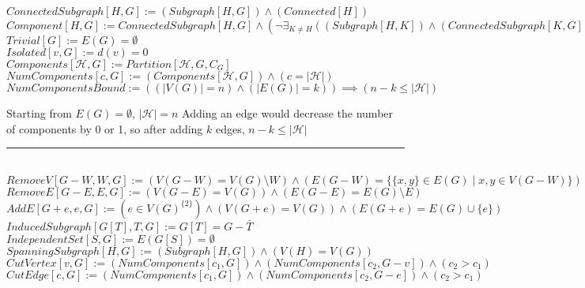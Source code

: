\documentclass{book}
\newcommand{\abr}{:=}
\newcommand{\pr}[1]{\left(#1\right)}
\newcommand{\st}{\mathbin{|}}
\newcommand{\utup}[1]{\{#1\}}
\begin{document}
$ConnectedSubgraph[H, G] \abr (Subgraph[H, G]) \land (Connected[H])$ \\
$Component[H, G] \abr ConnectedSubgraph[H, G] \land \pr{\lnot \exists_{K \neq H}\pr{(Subgraph[H, K]) \land (ConnectedSubgraph[K, G])}}$ \\
$Trivial[G] \abr E(G) = \emptyset$ \\
$Isolated[v, G] \abr d(v) = 0$ \\

$Components[\mathcal{H}, G] \abr Partition[\mathcal{H}, G, C_G]$ \\
$NumComponents[c, G] \abr (Components[\mathcal{H}, G]) \land (c = |\mathcal{H}|)$ \\

$NumComponentsBound \abr \pr{\pr{|V(G)| = n} \land \pr{|E(G)| = k}} \implies (n - k \leq |\mathcal{H}|)$ \\
\begin{enumerate}
  \lit Starting from $E(G) = \emptyset$, $|\mathcal{H}| = n$
  \lit Adding an edge would decrease the number of components by 0 or 1, so after adding $k$ edges, $n - k \leq |\mathcal{H}|$
\end{enumerate} \vspace{.75mm} \hrule \vspace{.75mm} \ \\ 

$RemoveV[G - W, W, G] \abr \pr{V(G - W) = V(G) \setminus W} \land \pr{E(G - W) = \{\utup{x, y} \in E(G) \st x, y \in V(G - W)\}}$ \\
$RemoveE[G - E, E, G] \abr \pr{V(G - E) = V(G)} \land \pr{E(G - E) = E(G) \setminus E}$ \\
$AddE[G + e, e, G] \abr \pr{e \in V(G)^{\{2\}}} \land \pr{V(G + e) = V(G)} \land \pr{E(G + e) = E(G) \cup \{e\}}$ \\
$InducedSubgraph[G[T], T, G] \abr G[T] = G - \bar{T}$ \\
$IndependentSet[S, G] \abr E(G[S]) = \emptyset $ \\
$SpanningSubgraph[H, G] \abr (Subgraph[H, G]) \land \pr{V(H) = V(G)}$ \\

$CutVertex[v, G] \abr (NumComponents[c_1, G]) \land (NumComponents[c_2, G - v]) \land (c_2 > c_1)$ \\
$CutEdge[e, G] \abr (NumComponents[c_1, G]) \land (NumComponents[c_2, G - e]) \land (c_2 > c_1)$ \\
\end{document}
